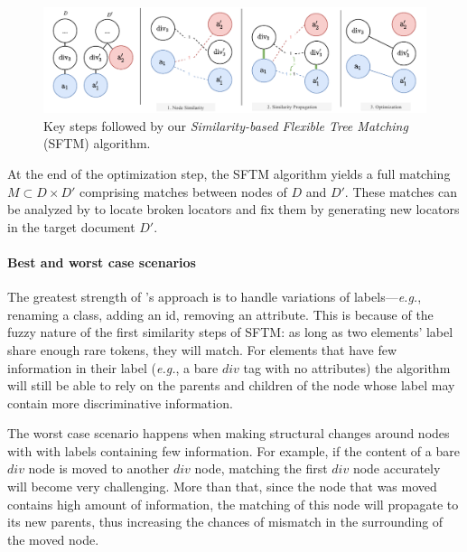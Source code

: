 \documentclass[preprint, 12pt]{elsarticle}
\begin{document}
\begin{figure}[!t]
    \centering
    \includegraphics[width=\linewidth]{explanations/sftm}
    \caption{Key steps followed by our \emph{Similarity-based Flexible Tree Matching} (SFTM) algorithm.}
    \label{fig:steps_sftm}
\end{figure}

At the end of the optimization step, the SFTM algorithm yields a full matching $M \subset D \times D' $ comprising matches between nodes of $D$ and $D'$.
These matches can be analyzed by \erratum{} to locate broken locators and fix them by generating new locators in the target document $D'$.

\paragraph{Best and worst case scenarios}
The greatest strength of \erratum's approach is to handle variations of labels---\emph{e.g.}, renaming a class, adding an id, removing an attribute.
This is because of the fuzzy nature of the first similarity steps of SFTM: as
long as two elements' label share enough rare tokens, they will match.
For elements that have few information in their label (\emph{e.g.}, a bare $div$ tag with no attributes) the algorithm will still be able to rely on the parents and children of the node whose label may contain more discriminative information.

The worst case scenario happens when making structural changes around nodes with with labels containing few information.
For example, if the content of a bare $div$ node is moved to another $div$ node,
matching the first $div$ node accurately will become very challenging.
More than that, since the node that was moved contains high amount of information, the matching of this node will propagate to its new parents, thus increasing the chances of mismatch in the surrounding of the moved node.

\end{document}
